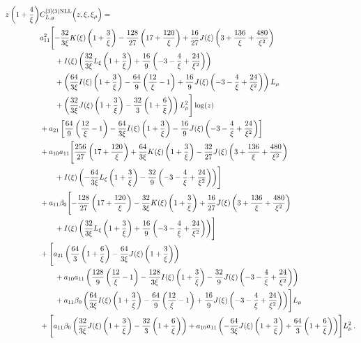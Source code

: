 \documentclass[a4paper]{article}
\begin{document}
\begin{align}
		z \left(1 + \frac{4}{\xi}\right) &C_{L,g}^{[3](3) \rm NLL}\Bigl(z,\xi,\xi_\mu\Bigr)= \notag\\
		& a_{11}^2 \Biggl[ -\frac{32}{3 \xi} K(\xi) \left(1 + \frac{3}{\xi}\right) - \frac{128}{27} \left(17 + \frac{120}{\xi}\right) + \frac{16}{27} J(\xi) \left(3 + \frac{136}{\xi} + \frac{480}{\xi^2}\right) \notag\\
		&\qquad + I(\xi) \left(\frac{32}{3\xi} L_\xi \left(1 + \frac{3}{\xi}\right) + \frac{16}{9} \left(-3 - \frac{4}{\xi} + \frac{24}{\xi^2}\right)\right) \notag\\
	 	& \qquad + \left(\frac{64}{3\xi} I(\xi) \left(1 + \frac{3}{\xi}\right) - \frac{64}{9} \left(\frac{12}{\xi} - 1\right) + \frac{16}{9} J(\xi) \left(-3 - \frac{4}{\xi} + \frac{24}{\xi^2}\right)\right) L_\mu \notag\\
		& \qquad + \left(\frac{32}{3\xi} J(\xi) \left(1 + \frac{3}{\xi}\right) - \frac{32}{3} \left(1 + \frac{6}{\xi}\right)\right) L_\mu^2\Biggr] \log(z)\notag\\
		& + a_{21} \left[\frac{64}{9} \left(\frac{12}{\xi} - 1\right) -\frac{64}{3\xi} I(\xi)  \left(1 + \frac{3}{\xi}\right) - \frac{16}{9} J(\xi) \left(-3 - \frac{4}{\xi} + \frac{24}{\xi^2}\right)\right] \notag\\
		& + a_{10} a_{11} \Biggl[\frac{256}{27} \left(17 + \frac{120}{\xi}\right) + \frac{64}{3\xi} K(\xi) \left(1 + \frac{3}{\xi}\right) - \frac{32}{27} J(\xi) \left(3 + \frac{136}{\xi} + \frac{480}{\xi^2}\right) \notag\\
		& \qquad + I(\xi) \left(-\frac{64}{3\xi} L_\xi \left(1 + \frac{3}{\xi}\right) - \frac{32}{9} \left(-3 - \frac{4}{\xi} + \frac{24}{\xi^2}\right)\right)\Biggr] \notag\\
		& + a_{11} \beta_0 \Biggl[- \frac{128}{27} \left(17 + \frac{120}{\xi}\right) -\frac{32}{3\xi} K(\xi) \left(1 + \frac{3}{\xi}\right) + \frac{16}{27} J(\xi) \left(3 + \frac{136}{\xi} + \frac{480}{\xi^2}\right) \notag\\
		& \qquad+ I(\xi) \left(\frac{32}{3\xi} L_\xi \left(1 + \frac{3}{\xi}\right) + \frac{16}{9} \left(-3 - \frac{4}{\xi} + \frac{24}{\xi^2}\right)\right)\Biggr] \notag\\
		& + \Biggl[a_{21} \left(\frac{64}{3} \left(1 + \frac{6}{\xi} \right) -\frac{64}{3\xi} J(\xi) \left(1 + \frac{3}{\xi}\right) \right) \notag\\
		& \qquad + a_{10} a_{11} \left(\frac{128}{9} \left(\frac{12}{\xi} - 1\right) -\frac{128}{3\xi} I(\xi) \left(1 + \frac{3}{\xi}\right) - \frac{32}{9} J(\xi) \left(-3 - \frac{4}{\xi} + \frac{24}{\xi^2}\right)\right)\notag \\
		& \qquad + a_{11} \beta_0 \left(\frac{64}{3\xi} I(\xi) \left(1 + \frac{3}{\xi}\right) - \frac{64}{9} \left(\frac{12}{\xi} - 1\right) + \frac{16}{9} J(\xi) \left(-3 - \frac{4}{\xi} + \frac{24}{\xi^2}\right)\right)\Biggr] L_\mu \notag\\
		& + \Biggl[ a_{11} \beta_0 \left( \frac{32}{3\xi} J(\xi) \left(1 + \frac{3}{\xi}\right) - \frac{32}{3} \left(1 + \frac{6}{\xi}\right) \right)
		+ a_{10} a_{11} \left(-\frac{64}{3\xi} J(\xi) \left(1 + \frac{3}{\xi}\right) + \frac{64}{3} \left(1 + \frac{6}{\xi}\right) \right) \Biggr] L_\mu^2\,. \label{CL_g3}
	\end{align}
\end{document}
